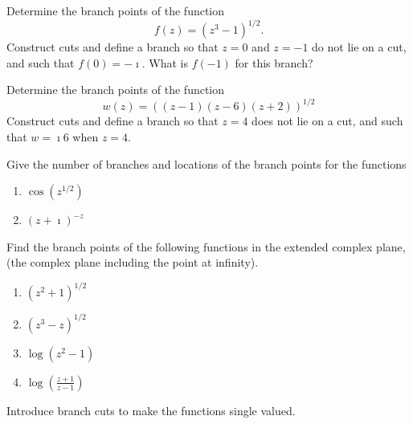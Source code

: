{\begin{Exercise}
\end{Exercise}






\begin{Exercise}
  \label{exercise z3112}
  Determine the branch points of the function
  \[
  f(z) = \left( z^3 - 1 \right)^{1/2}.
  \]
  Construct cuts and define a branch so that $z = 0$ and $z = -1$ do 
  not lie on a
  cut, and such that $f(0) = -\imath$. What is $f(-1)$ for this branch?

\end{Exercise}





\begin{Exercise}
  \label{exercise z1z6z2}
  Determine the branch points of the function
  \[
  w(z) = \left( (z-1) (z-6) (z+2) \right)^{1/2}
  \]
  Construct cuts and define a branch so that $z = 4$ does not lie
  on a cut, and such that $w = \imath 6$ when $z = 4$.

\end{Exercise}






\begin{Exercise}
  \label{exercise cos z12}
  Give the number of branches and locations of the branch points for the 
  functions
  \begin{enumerate}
  \item $\displaystyle \cos \left( z^{1/2} \right)$
  \item $\displaystyle (z + \imath)^{-z}$
  \end{enumerate}

\end{Exercise}









\begin{Exercise}
  \label{exercise z2112}
  Find the branch points of the following functions in the extended complex
  plane, (the complex plane including the point at infinity).
  \begin{enumerate}
  \item $\displaystyle \left( z^2 + 1 \right)^{1/2}$
  \item $\displaystyle \left( z^3 - z \right)^{1/2}$
  \item $\displaystyle \log \left( z^2 - 1 \right)$
  \item $\displaystyle \log \left( \frac{z+1}{z-1} \right)$
  \end{enumerate}
  Introduce branch cuts to make the functions single valued.


\end{Exercise}}
